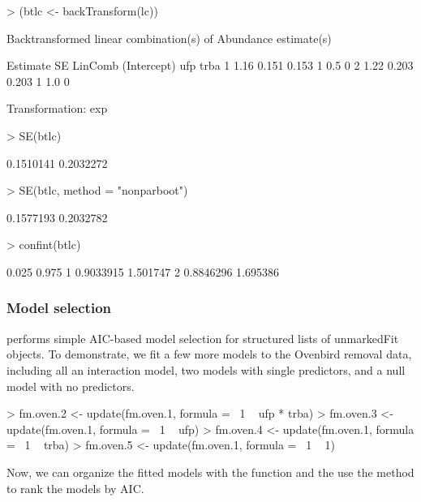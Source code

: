 \documentclass[article,shortnames]{jss}
\begin{document}
\begin{Schunk}
\begin{Sinput}
> (btlc <- backTransform(lc))
\end{Sinput}
\begin{Soutput}
Backtransformed linear combination(s) of Abundance estimate(s)

  Estimate    SE LinComb (Intercept) ufp trba
1     1.16 0.151   0.153           1 0.5    0
2     1.22 0.203   0.203           1 1.0    0

Transformation: exp 
\end{Soutput}
\begin{Sinput}
> SE(btlc)
\end{Sinput}
\begin{Soutput}
[1] 0.1510141 0.2032272
\end{Soutput}
\begin{Sinput}
> SE(btlc, method = "nonparboot")
\end{Sinput}
\begin{Soutput}
[1] 0.1577193 0.2032782
\end{Soutput}
\begin{Sinput}
> confint(btlc)
\end{Sinput}
\begin{Soutput}
      0.025    0.975
1 0.9033915 1.501747
2 0.8846296 1.695386
\end{Soutput}
\end{Schunk}


\subsubsection{Model selection}

 performs simple AIC-based model selection for structured lists of unmarkedFit objects.  To demonstrate, we fit a few more models to the Ovenbird
removal data, including all an interaction model, two models with
single predictors, and a null model with no predictors.

\begin{Schunk}
\begin{Sinput}
> fm.oven.2 <- update(fm.oven.1, formula = ~1 ~ ufp * trba)
> fm.oven.3 <- update(fm.oven.1, formula = ~1 ~ ufp)
> fm.oven.4 <- update(fm.oven.1, formula = ~1 ~ trba)
> fm.oven.5 <- update(fm.oven.1, formula = ~1 ~ 1)
\end{Sinput}
\end{Schunk}

Now, we can organize the fitted models with the  function and
the use the  method to rank the models by AIC.
\end{document}
